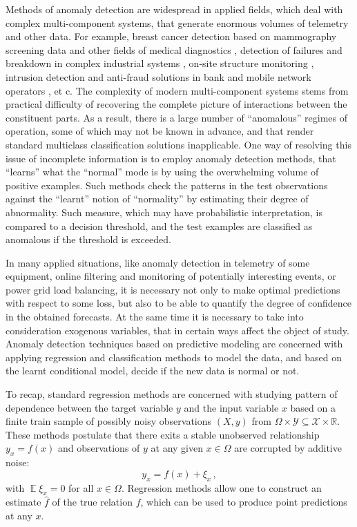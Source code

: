 \documentclass[a4paper,14pt]{extarticle}
\newcommand{\ex}{\mathop{\mathbb{E}}\nolimits}
\newcommand{\Xcal}{\mathcal{X}}
\newcommand{\Ycal}{\mathcal{Y}}
\newcommand{\Real}{\mathbb{R}}
\begin{document}
Methods of anomaly detection are widespread in applied fields, which deal with complex
multi-component systems, that generate enormous volumes of telemetry and other data.
For example, breast cancer detection based on mammography screening data \cite{tarassenko1995}
and other fields of medical diagnostics \cite{quinn2007,clifton2011}, detection of
failures and breakdown in complex industrial systems \cite{tarassenko2009}, on-site
structure monitoring \cite{surace2010}, intrusion detection and anti-fraud solutions
in bank and mobile network operators \cite{patcha2007,jyothsna2011}, et c. The complexity
of modern multi-component systems stems from practical difficulty of recovering the
complete picture of interactions between the constituent parts. As a result, there
is a large number of ``anomalous'' regimes of operation, some of which may not be
known in advance, and that render standard multiclass classification solutions inapplicable.
One way of resolving this issue of incomplete information is to employ anomaly detection
methods, that ``learns'' what the ``normal'' mode is by using the overwhelming volume
of positive examples. Such methods check the patterns in the test observations against
the ``learnt'' notion of ``normality'' by estimating their degree of abnormality.
Such measure, which may have probabilistic interpretation, is compared to a decision
threshold, and the test examples are classified as anomalous if the threshold is
exceeded.

In many applied situations, like anomaly detection in telemetry of some equipment,
online filtering and monitoring of potentially interesting events, or power grid
load balancing, it is necessary not only to make optimal predictions with respect
to some loss, but also to be able to quantify the degree of confidence in the obtained
forecasts. At the same time it is necessary to take into consideration exogenous
variables, that in certain ways affect the object of study. Anomaly detection techniques
based on predictive modeling are concerned with applying regression and classification
methods to model the data, and based on the learnt conditional model, decide if the
new data is normal or not.

To recap, standard regression methods are concerned with studying pattern of dependence
between the target variable $y$ and the input variable $x$ based on a finite train
sample of  possibly noisy observations $(X, y)$ from $\Omega\times \Ycal \subseteq
\Xcal\times\Real$. These methods postulate that there exits a stable unobserved relationship
$y_x = f(x)$ and observations of $y$ at any given $x\in\Omega$ are corrupted by
additive noise:
\begin{equation} \label{eq:signal_model}
  y_x = f(x) + \xi_x \,,
\end{equation}
with $\ex \xi_x = 0$ for all $x\in \Omega$. Regression methods allow one to construct
an estimate $\hat{f}$ of the true relation $f$, which can be used to produce point
predictions at any $x$.
\end{document}
